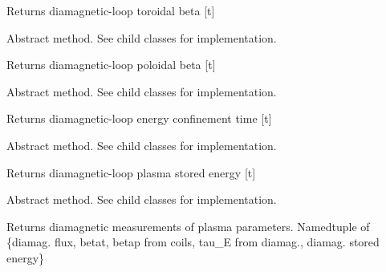 \documentclass[letterpaper,10pt,english]{sphinxmanual}
\begin{document}
\begin{fulllineitems}
\begin{fulllineitems}
Returns diamagnetic-loop toroidal beta {[}t{]}

\end{fulllineitems}


\begin{fulllineitems}
\label{eqtools:eqtools.core.Equilibrium.getDiamagBetaP}
Abstract method.  See child classes for implementation.

Returns diamagnetic-loop poloidal beta {[}t{]}

\end{fulllineitems}


\begin{fulllineitems}
\label{eqtools:eqtools.core.Equilibrium.getDiamagTauE}
Abstract method.  See child classes for implementation.

Returns diamagnetic-loop energy confinement time {[}t{]}

\end{fulllineitems}


\begin{fulllineitems}
\label{eqtools:eqtools.core.Equilibrium.getDiamagWp}
Abstract method.  See child classes for implementation.

Returns diamagnetic-loop plasma stored energy {[}t{]}

\end{fulllineitems}


\begin{fulllineitems}
\label{eqtools:eqtools.core.Equilibrium.getDiamag}
Abstract method.  See child classes for implementation.

Returns diamagnetic measurements of plasma parameters.
Namedtuple of \{diamag. flux, betat, betap from coils, tau\_E from diamag., diamag. stored energy\}

\end{fulllineitems}



\end{fulllineitems}
\end{document}

